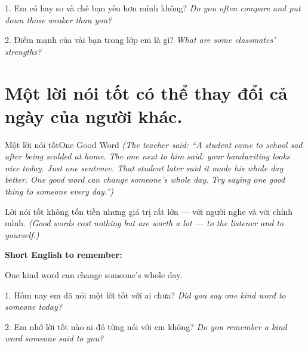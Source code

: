 \begin{tuhocnhanh}
1. Em có hay so và chê bạn yếu hơn mình không? \textit{Do you often compare and put down those weaker than you?}

2. Điểm mạnh của vài bạn trong lớp em là gì? \textit{What are some classmates' strengths?}
\end{tuhocnhanh}
\ngancach

\section{Một lời nói tốt có thể thay đổi cả ngày của người khác.}
\begin{truyen}{Một lời nói tốt}{One Good Word}
\textit{(The teacher said: ``A student came to school sad after being scolded at home. The one next to him said: \textit{your handwriting looks nice today}. Just one sentence. That student later said it made his whole day better. One good word can change someone's whole day. Try saying one good thing to someone every day.'')}
\end{truyen}

\begin{baihoc}
Lời nói tốt không tốn tiền nhưng giá trị rất lớn — với người nghe và với chính mình.
\textit{(Good words cost nothing but are worth a lot — to the listener and to yourself.)}
\end{baihoc}

\begin{ghinhoanh}
\textbf{Short English to remember:}

One kind word can change someone's whole day.

\end{ghinhoanh}

\begin{tuhocnhanh}
1. Hôm nay em đã nói một lời tốt với ai chưa? \textit{Did you say one kind word to someone today?}

2. Em nhớ lời tốt nào ai đó từng nói với em không? \textit{Do you remember a kind word someone said to you?}
\end{tuhocnhanh}
\ngancach

